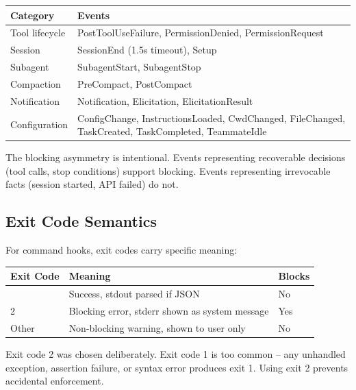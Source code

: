 \documentclass[
  english,
  11pt,
  letterpaper,
]{book}
\begin{document}
\begin{longtable}[]{@{}
  >{\raggedright\arraybackslash}p{}
  >{\raggedright\arraybackslash}p{}@{}}
\toprule\noalign{}
\begin{minipage}[b]{\linewidth}\raggedright
Category
\end{minipage} & \begin{minipage}[b]{\linewidth}\raggedright
Events
\end{minipage} \\
\midrule\noalign{}
\endhead
\bottomrule\noalign{}
\endlastfoot
Tool lifecycle & PostToolUseFailure, PermissionDenied,
PermissionRequest \\
Session & SessionEnd (1.5s timeout), Setup \\
Subagent & SubagentStart, SubagentStop \\
Compaction & PreCompact, PostCompact \\
Notification & Notification, Elicitation, ElicitationResult \\
Configuration & ConfigChange, InstructionsLoaded, CwdChanged,
FileChanged, TaskCreated, TaskCompleted, TeammateIdle \\
\end{longtable}

The blocking asymmetry is intentional. Events representing recoverable
decisions (tool calls, stop conditions) support blocking. Events
representing irrevocable facts (session started, API failed) do not.

\subsection{Exit Code Semantics}\label{exit-code-semantics}

For command hooks, exit codes carry specific meaning:

\begin{longtable}[]{@{}lll@{}}
\toprule\noalign{}
Exit Code & Meaning & Blocks \\
\midrule\noalign{}
\endhead
\bottomrule\noalign{}
\endlastfoot
0 & Success, stdout parsed if JSON & No \\
2 & Blocking error, stderr shown as system message & Yes \\
Other & Non-blocking warning, shown to user only & No \\
\end{longtable}

Exit code 2 was chosen deliberately. Exit code 1 is too common -- any
unhandled exception, assertion failure, or syntax error produces exit 1.
Using exit 2 prevents accidental enforcement.
\end{document}
